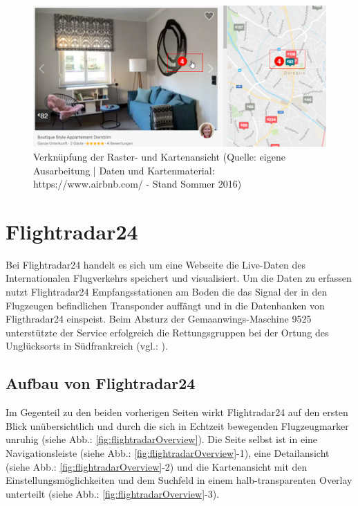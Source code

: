 \documentclass[../Bachelorarbeit.tex]{subfiles}
\begin{document}
\begin{figure}[H]
\centering
\includegraphics[width=1\linewidth]{img/StandDerTechnik/airbnbDetail}
\caption[Verknüpfung der Raster- und Kartenansicht]{Verknüpfung der Raster- und Kartenansicht (Quelle: eigene Ausarbeitung | Daten und Kartenmaterial: https://www.airbnb.com/ - Stand Sommer 2016)}
\label{fig:airbnbDetail}
\end{figure}




\section{Flightradar24}
\label{Flightradar}
Bei Flightradar24 handelt es sich um eine Webseite die Live-Daten des Internationalen Flugverkehrs speichert und visualisiert. 
Um die Daten zu erfassen nutzt Flightradar24 Empfangsstationen am Boden die das Signal der in den Flugzeugen befindlichen Transponder auffängt und in die Datenbanken von Fligthradar24 einspeist. 
Beim Absturz der Gemaanwings-Maschine 9525 unterstützte der Service erfolgreich die Rettungsgruppen bei der Ortung des Unglücksorts in Südfrankreich (vgl.: \cite{SiebeckFlightradar}).


\subsection{Aufbau von Flightradar24}
\label{flightradarAufbau}
Im Gegenteil zu den beiden vorherigen Seiten wirkt Flightradar24 auf den ersten Blick unübersichtlich und durch die sich in Echtzeit bewegenden Flugzeugmarker unruhig (siehe Abb.: \ref{fig:flightradarOverview}).
Die Seite selbst ist in eine Navigationsleiste (siehe Abb.: \ref{fig:flightradarOverview}-1), eine Detailansicht (siehe Abb.: \ref{fig:flightradarOverview}-2) und die Kartenansicht mit den Einstellungsmöglichkeiten und dem Suchfeld in einem halb-transparenten Overlay unterteilt (siehe Abb.: \ref{fig:flightradarOverview}-3). 
\end{document}
